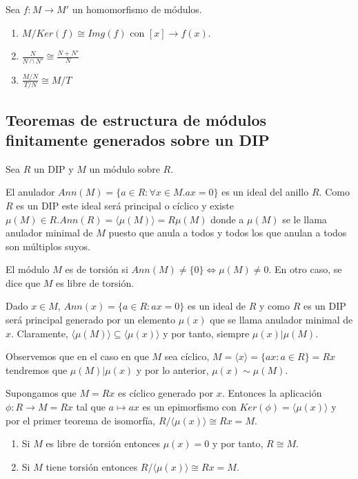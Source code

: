 \begin{theorem}
Sea $f:M \to M'$ un homomorfismo de módulos.

\begin{enumerate}
\item $M/Ker(f) \cong Img(f)$ con $[x] \to f(x)$. 
\item $\frac{N}{N \cap N'} \cong \frac{N+N'}{N}$
\item $\frac{M/N}{T/N} \cong M/T$
\end{enumerate}
\end{theorem}

\subsection{Teoremas de estructura de módulos finitamente generados sobre un DIP}

\begin{definition}
Sea $R$ un DIP y $M$ un módulo sobre $R$. 

El anulador $Ann(M) = \{a \in R:\forall x \in M.ax = 0 \}$ es un ideal del anillo $R$. Como $R$ es un DIP este ideal será principal o cíclico y existe $\mu(M) \in R. Ann(R) = \langle \mu(M) \rangle = R\mu(M)$ donde a $\mu(M)$ se le llama anulador minimal de $M$ puesto que anula a todos y todos los que anulan a todos son múltiplos suyos. 

El módulo $M$ es de torsión si $Ann(M) \neq \{0\} \iff \mu(M) \neq 0$. En otro caso, se dice que $M$ es libre de torsión. 

Dado $x \in M$, $Ann(x) = \{a \in R:ax = 0\}$ es un ideal de $R$ y como $R$ es un DIP será principal generado por un elemento $\mu(x)$ que se llama anulador minimal de $x$. Claramente, $\langle \mu(M) \rangle \subseteq \langle \mu(x) \rangle$ y por tanto, siempre $\mu(x) | \mu(M)$.

Observemos que en el caso en que $M$ sea cíclico, $M = \langle x \rangle = \{ax:a \in R \} = Rx$ tendremos que $\mu(M)|\mu(x)$ y por lo anterior, $\mu(x) \sim \mu(M)$. 
\end{definition}

\begin{proposition}
Supongamos que $M = Rx$ es cíclico generado por $x$. Entonces la aplicación $\phi:R \to M = Rx$ tal que $a \mapsto ax$ es un epimorfismo con $Ker(\phi) = \langle \mu(x) \rangle$ y por el primer teorema de isomorfía, $R/\langle \mu(x) \rangle \cong Rx = M$. 

\begin{enumerate}
\item Si $M$ es libre de torsión entonces $\mu(x) = 0$ y por tanto, $R \cong M$.
\item Si $M$ tiene torsión entonces $R/\langle \mu(x) \rangle \cong Rx = M$. 
\end{enumerate}
\end{proposition}


